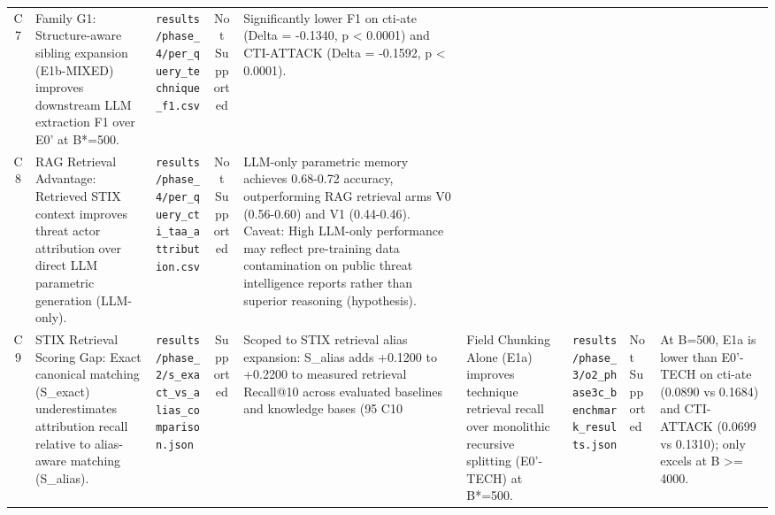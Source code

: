 \begin{table}[htbp]
\begin{tabular}{cp{5.5cm}p{4cm}cp{4.5cm}}
C7 & Family G1: Structure-aware sibling expansion (E1b-MIXED) improves downstream LLM extraction F1 over E0' at B*=500. & \texttt{results/phase_4/per_query_technique_f1.csv} & Not Supported & Significantly lower F1 on cti-ate (Delta = -0.1340, p < 0.0001) and CTI-ATTACK (Delta = -0.1592, p < 0.0001). \\
C8 & RAG Retrieval Advantage: Retrieved STIX context improves threat actor attribution over direct LLM parametric generation (LLM-only). & \texttt{results/phase_4/per_query_cti_taa_attribution.csv} & Not Supported & LLM-only parametric memory achieves 0.68-0.72 accuracy, outperforming RAG retrieval arms V0 (0.56-0.60) and V1 (0.44-0.46). Caveat: High LLM-only performance may reflect pre-training data contamination on public threat intelligence reports rather than superior reasoning (hypothesis). \\
C9 & STIX Retrieval Scoring Gap: Exact canonical matching (S_exact) underestimates attribution recall relative to alias-aware matching (S_alias). & \texttt{results/phase_2/s_exact_vs_alias_comparison.json} & Supported & Scoped to STIX retrieval alias expansion: S_alias adds +0.1200 to +0.2200 to measured retrieval Recall@10 across evaluated baselines and knowledge bases (95%
C10 & Field Chunking Alone (E1a) improves technique retrieval recall over monolithic recursive splitting (E0'-TECH) at B*=500. & \texttt{results/phase_3/o2_phase3c_benchmark_results.json} & Not Supported & At B=500, E1a is lower than E0'-TECH on cti-ate (0.0890 vs 0.1684) and CTI-ATTACK (0.0699 vs 0.1310); only excels at B >= 4000. \\
\hline
\end{tabular}
\end{table}